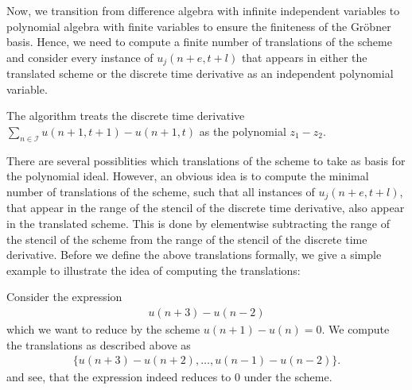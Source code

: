\documentclass[runningheads]{llncs}
\newcommand{\1}{\chi}
\newcommand{\Ii}{\mathcal{I}}
\begin{document}
Now, we transition from difference algebra with infinite independent variables to polynomial algebra with finite variables to ensure the finiteness of the Gr{\"o}bner basis. 
Hence, we need to compute a finite number of translations of the scheme and consider every instance of $u_j(n+e,t+l)$ that appears in either the translated scheme or the discrete time derivative as an independent polynomial variable.
\begin{example}
	The algorithm treats the discrete time derivative $\sum_{n\in\Ii}u(n+1,t+1)-u(n+1,t)$
	as the polynomial $z_1-z_2$.
\end{example}
There are several possiblities which translations of the scheme to take as basis for the polynomial ideal. However, an obvious idea is to compute the minimal number of translations of the scheme, such that all instances of $u_j(n+e,t+l)$, that appear in the range of the stencil of the discrete time derivative, also appear in the translated scheme.
This is done by elementwise subtracting the range of the stencil of the scheme from the range of the stencil of the discrete time derivative. Before we define the above translations formally, we give a simple example to illustrate the idea of computing the translations:
\begin{example}
	Consider the expression
	\begin{gather*}
		u(n+3)-u(n-2)
	\end{gather*}
	which we want to reduce by the scheme $u(n+1)-u(n)=0$. We compute the translations as described above as
	\begin{gather*}
		\{u(n+3)-u(n+2),\dots,u(n-1)-u(n-2)\}.
	\end{gather*}
	and see, that the expression indeed reduces to $0$ under the scheme.
\end{example}
\end{document}
